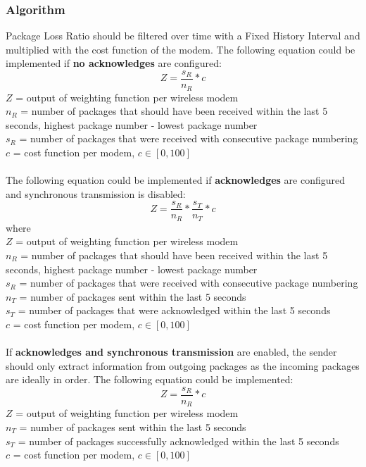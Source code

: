 \subsubsection{Algorithm}
Package Loss Ratio should be filtered over time with a Fixed History Interval and multiplied with the cost function of the modem. The following equation could be implemented if \textbf{no acknowledges} are configured:
\begin{equation}
Z = \frac{s_R}{n_R} * c 
\end{equation}
$Z$ = output of weighting function per wireless modem\\
$n_R$ = number of packages that should have been received within the last 5 seconds, highest package number - lowest package number\\
$s_R$ = number of packages that were received with consecutive package numbering\\
$c$ = cost function per modem, $c \in [0, 100]$\\\\
%
The following equation could be implemented if \textbf{acknowledges} are configured and synchronous transmission is disabled:
\begin{equation}
Z = \frac{s_R}{n_R} * \frac{s_T}{n_T} * c
\end{equation}
where\\
$Z$ = output of weighting function per wireless modem\\
$n_R$ = number of packages that should have been received within the last 5 seconds, highest package number - lowest package number\\
$s_R$ = number of packages that were received with consecutive package numbering\\
$n_T$ = number of packages sent within the last 5 seconds\\
$s_T$ = number of packages that were acknowledged within the last 5 seconds\\
$c$ = cost function per modem, $c \in [0, 100]$\\\\
%
If \textbf{acknowledges and synchronous transmission} are enabled, the sender should only extract information from outgoing packages as the incoming packages are ideally in order. The following equation could be implemented:
\begin{equation}
Z = \frac{s_R}{n_R} * c 
\end{equation}
$Z$ = output of weighting function per wireless modem\\
$n_T$ = number of packages sent within the last 5 seconds\\
$s_T$ = number of packages successfully acknowledged within the last 5 seconds\\
$c$ = cost function per modem, $c \in [0, 100]$\\
%
%
%

